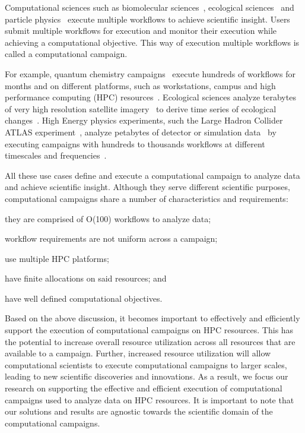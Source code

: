 
Computational sciences such as biomolecular sciences~\cite{cheatham2015impact,
dakka2018concurrent}, ecological sciences~\cite{goncalves2020sealnet,
paraskevakos2019workflow} and particle physics~\cite{atlas} execute multiple
workflows to achieve scientific insight. Users submit multiple workflows for
execution and monitor their execution while achieving a computational objective.
This way of execution multiple workflows is called a computational campaign.

For example, quantum chemistry campaigns~\cite{smith2020molssi} execute hundreds
of workflows for months and on different platforms, such as workstations, campus
and high performance computing (HPC) resources~\cite{smith2020molssi}.
Ecological sciences analyze terabytes of very high resolution satellite
imagery~\cite{goncalves2020sealnet} to derive time series of ecological
changes~\cite{paraskevakos2019workflow}. High Energy physics experiments, such
the Large Hadron Collider ATLAS experiment~\cite{atlas}, analyze petabytes of
detector or simulation data~\cite{borodin2015big} by executing campaigns with
hundreds to thousands workflows at different timescales and
frequencies~\cite{borodin2015big}.

All these use cases define and execute a computational campaign to analyze data
and achieve scientific insight. Although they serve different scientific
purposes, computational campaigns share a number of characteristics and
requirements:
\begin{inparaenum}[(1)]
    \item they are comprised of O(100) workflows to analyze data;
    \item workflow requirements are not uniform across a campaign;
    \item use multiple HPC platforms;
    \item have finite allocations on said resources; and
    \item have well defined computational objectives.
\end{inparaenum}

Based on the above discussion, it becomes important to effectively and
efficiently support the execution of computational campaigns on
HPC resources. This has the potential to increase overall resource utilization
across all resources that are available to a campaign. Further, increased
resource utilization will allow computational scientists to execute
computational campaigns to larger scales, leading to new scientific discoveries
and innovations. As a result, we focus our research on supporting the effective
and efficient execution of computational campaigns used to analyze data on HPC
resources. It is important to note that our solutions and results are agnostic
towards the scientific domain of the computational campaigns.

